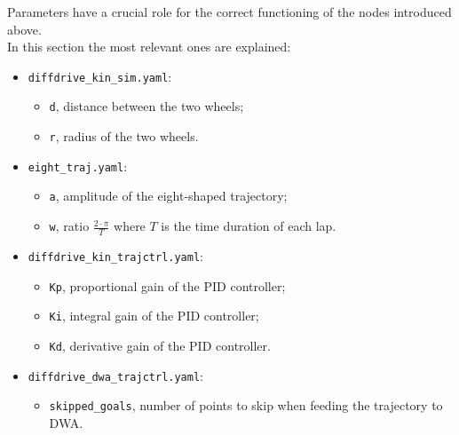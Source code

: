 \documentclass[11pt,a4paper]{article}
\begin{document}
Parameters have a crucial role for the correct functioning of the nodes introduced above.\\

In this section the most relevant ones are explained:\\
\begin{itemize}

    \item \texttt{diffdrive\_kin\_sim.yaml}:
        \begin{itemize}
            \item \texttt{d}, distance between the two wheels;
            \item \texttt{r}, radius of the two wheels.\\
        \end{itemize}

    \item \texttt{eight\_traj.yaml}:
        \begin{itemize}
            \item \texttt{a}, amplitude of the eight-shaped trajectory;
            \item \texttt{w}, ratio $\frac{2 \cdot \pi }{T}$ where $T$ is the time duration of each lap.\\
        \end{itemize}

    \item \texttt{diffdrive\_kin\_trajctrl.yaml}:
        \begin{itemize}
            \item \texttt{Kp}, proportional gain of the PID controller;
            \item \texttt{Ki}, integral gain of the PID controller;
            \item \texttt{Kd}, derivative gain of the PID controller.\\
        \end{itemize}

    \item \texttt{diffdrive\_dwa\_trajctrl.yaml}:
        \begin{itemize}
            \item \texttt{skipped\_goals}, number of points to skip when feeding the trajectory to DWA.\\
        \end{itemize}


\end{itemize}
\end{document}
